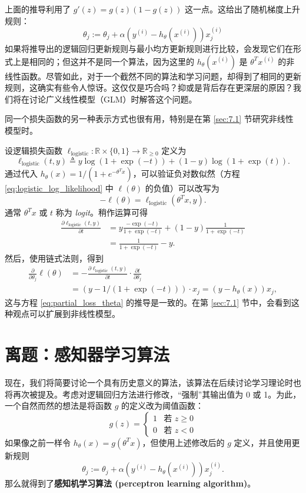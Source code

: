 上面的推导利用了 $g'(z) = g(z)(1-g(z))$ 这一点。这给出了随机梯度上升规则：
\[
    \theta_j := \theta_j + \alpha (y^{(i)} - h_\theta(x^{(i)})) x_j^{(i)}
\]
如果将推导出的逻辑回归更新规则与最小均方更新规则进行比较，会发现它们在形式上是相同的；但这并不是同一个算法，因为这里的 $h_\theta(x^{(i)})$ 是 $\theta^T x^{(i)}$ 的非线性函数。尽管如此，对于一个截然不同的算法和学习问题，却得到了相同的更新规则，这确实有些令人惊讶。这仅仅是巧合吗？抑或是背后存在更深层的原因？我们将在讨论广义线性模型（GLM）时解答这个问题。

\begin{remark}\label{remark:2.1.1}
    同一个损失函数的另一种表示方式也很有用，特别是在第 \ref{sec:7.1} 节研究非线性模型时。
\end{remark}
\noindent 设逻辑损失函数 $\ell_{\text{logistic}}: \mathbb{R} \times \{0, 1\} \to \mathbb{R}_{\ge 0}$ 定义为
\begin{equation}
    \ell_{\text{logistic}}(t, y) \triangleq y \log(1 + \exp(-t)) + (1 - y) \log(1 + \exp(t)).
\end{equation}
通过代入 $h_\theta(x) = 1/(1 + e^{-\theta^T x})$，可以验证负对数似然（方程 \eqref{eq:logistic_log_likelihood} 中 $\ell(\theta)$ 的负值）可以改写为
\begin{equation}
    -\ell(\theta) = \ell_{\text{logistic}}(\theta^T x, y).
\end{equation}
通常 $\theta^T x$ 或 $t$ 称为 \textit{logit}。稍作运算可得
\begin{align}
    \frac{\partial \ell_{\text{logistic}}(t, y)}{\partial t} &= y \frac{-\exp(-t)}{1 + \exp(-t)} + (1 - y) \frac{1}{1 + \exp(-t)} \\ 
    &= \frac{1}{1 + \exp(-t)} - y. \label{eq:2.6}
\end{align}
然后，使用链式法则，得到
\begin{align}
    \frac{\partial}{\partial \theta_j} \ell(\theta) &= - \frac{\partial \ell_{\text{logistic}}(t, y)}{\partial t} \cdot \frac{\partial t}{\partial \theta_j} \\ 
    &= (y-1/(1+\exp(-t))) \cdot x_j = (y - h_\theta(x)) x_j, 
\end{align}
这与方程 \eqref{eq:partial_loss_theta} 的推导是一致的。在第 \ref{sec:7.1} 节中，会看到这种观点可以扩展到非线性模型。

\section{离题：感知器学习算法}

现在，我们将简要讨论一个具有历史意义的算法，该算法在后续讨论学习理论时也将再次被提及。考虑对逻辑回归方法进行修改，“强制”其输出值为 0 或 1。为此，一个自然而然的想法是将函数 $g$ 的定义改为阈值函数：
\[
    g(z) = 
    \begin{cases} 
        1 & \text{若 } z \ge 0 \\
        0 & \text{若 } z < 0 
    \end{cases}
\]
如果像之前一样令 $h_\theta(x) = g(\theta^T x)$，但使用上述修改后的 $g$ 定义，并且使用更新规则
\[
    \theta_j := \theta_j + \alpha (y^{(i)} - h_\theta(x^{(i)})) x_j^{(i)}.
\]
那么就得到了\textbf{感知机学习算法 (perceptron learning algorithm)}。

